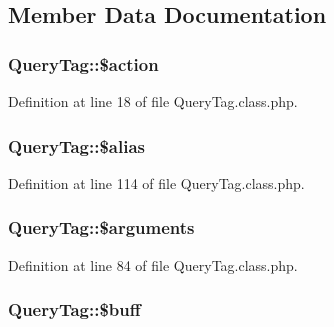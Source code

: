 \subsection{Member Data Documentation}
\subsubsection[{\texorpdfstring{\$action}{$action}}]{\setlength{\rightskip}{0pt plus 5cm}Query\+Tag\+::\$action}\hypertarget{classQueryTag_a5e2e78261306a4a4db69c643e9524e60}{}\label{classQueryTag_a5e2e78261306a4a4db69c643e9524e60}


Definition at line 18 of file Query\+Tag.\+class.\+php.

\subsubsection[{\texorpdfstring{\$alias}{$alias}}]{\setlength{\rightskip}{0pt plus 5cm}Query\+Tag\+::\$alias}\hypertarget{classQueryTag_a86de241a75c3037c30272c7eb4a2cfbc}{}\label{classQueryTag_a86de241a75c3037c30272c7eb4a2cfbc}


Definition at line 114 of file Query\+Tag.\+class.\+php.

\subsubsection[{\texorpdfstring{\$arguments}{$arguments}}]{\setlength{\rightskip}{0pt plus 5cm}Query\+Tag\+::\$arguments}\hypertarget{classQueryTag_a236e4bf42871aeac6c84f4dbbd1e6cb2}{}\label{classQueryTag_a236e4bf42871aeac6c84f4dbbd1e6cb2}


Definition at line 84 of file Query\+Tag.\+class.\+php.

\subsubsection[{\texorpdfstring{\$buff}{$buff}}]{\setlength{\rightskip}{0pt plus 5cm}Query\+Tag\+::\$buff}\hypertarget{classQueryTag_abe10d8fd334fac380dd5540b2c0bdcc8}{}\label{classQueryTag_abe10d8fd334fac380dd5540b2c0bdcc8}


